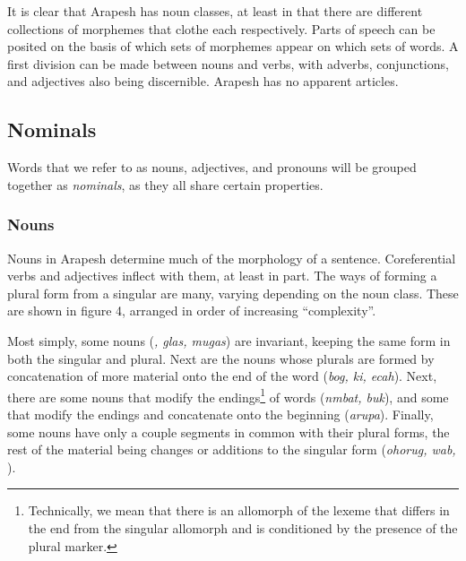 \documentclass[pdftex,12pt,letterpaper]{article}
\let\ipa\textipa
\def\sw{\ipa{\super w}}
\begin{document}
 It is clear that Arapesh has noun classes, at least in that there are different collections of morphemes that clothe each respectively. Parts of speech can be posited on the basis of which sets of morphemes appear on which sets of words. A first division can be made between nouns and verbs, with adverbs, conjunctions, and adjectives also being discernible. Arapesh has no apparent articles. 


\subsection{Nominals}

Words that we refer to as nouns, adjectives, and pronouns will be grouped together as \emph{nominals}, as they all share certain properties.

 \subsubsection{Nouns}

 Nouns in Arapesh determine much of the morphology of a sentence. Coreferential verbs and adjectives inflect with them, at least in part. The ways of forming a plural form from a singular are many, varying depending on the noun class. These are shown in figure 4, arranged in order of increasing ``complexity''. 

 Most simply, some nouns (\emph{\ipa{\textltailn eg1r}, glas, mugas}) are invariant, keeping the same form in both the singular and plural. Next are the nouns whose plurals are formed by concatenation of more material onto the end of the word (\emph{bog, ki, ecah\sw}). Next, there are some nouns that modify the endings\footnote{Technically, we mean that there is an allomorph of the lexeme that differs in the end from the singular allomorph and is conditioned by the presence of the plural marker.} of words (\emph{n\ipa{1}mbat, buk}), and some that modify the endings and concatenate onto the beginning (\emph{arupa}). Finally, some nouns have only a couple segments in common with their plural forms, the rest of the material being changes or additions to the singular form (\emph{ohorug, wab, \ipa{y@rih}}).
\end{document}
